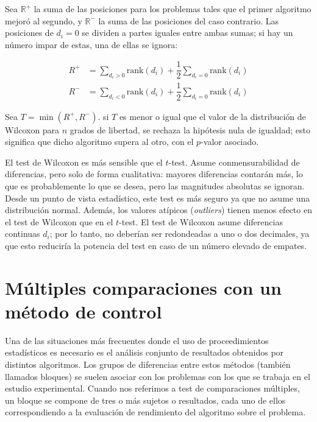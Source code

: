 Sea $\mathbb{R}^+$ la suma de las posiciones para los problemas tales que el primer algoritmo mejoró al segundo, y $\mathbb{R}^-$ la suma de las posiciones del caso contrario. 
Las posiciones de $d_i = 0$ se dividen a partes iguales entre ambas sumas; si hay un número impar de estas, una de ellas se ignora:

\begin{equation}
\begin{aligned}
R^+ & = \sum_{d_i>0} \text{rank}(d_i) + \dfrac{1}{2} \sum_{d_i=0}\text{rank}(d_i) \\
R^- & = \sum_{d_i<0} \text{rank}(d_i) + \dfrac{1}{2} \sum_{d_i=0}\text{rank}(d_i) 
\end{aligned}
\label{eq:4.34}
\end{equation}

Sea $T = \min(R^+,R^-)$. 
si $T$ es menor o igual que el valor de la distribución de Wilcoxon para $n$ grados de libertad, se rechaza la hipótesis nula de igualdad; esto significa que dicho algoritmo supera al otro, con el $p$-valor asociado. 

El test de Wilcoxon es más sensible que el $t$-test. 
Asume conmensurabilidad de diferencias, pero solo de forma cualitativa: mayores diferencias contarán más, lo que es probablemente lo que se desea, pero las magnitudes absolutas se ignoran. 
Desde un punto de vista estadístico, este test es más seguro ya que no asume una distribución normal. 
Además, los valores atípicos (\textit{outliers}) tienen menos efecto en el test de Wilcoxon que en el $t$-test. 
El test de Wilcoxon asume diferencias continuas $d_i$; por lo tanto, no deberían ser redondeadas a uno o dos decimales, ya que esto reduciría la potencia del test en caso de un número elevado de empates. 

\section{Múltiples comparaciones con un método de control}

Una de las situaciones más frecuentes donde el uso de proceedimientos estadísticos es necesario es el análisis conjunto de resultados obtenidos por distintos algoritmos. 
Los grupos de diferencias entre estos métodos (también llamados bloques) se suelen asociar con los problemas con los que se trabaja en el estudio experimental. 
Cuando nos referimos a test de comparaciones múltiples, un bloque se compone de tres o más sujetos o resultados, cada uno de ellos correspondiendo a la evaluación de rendimiento del algoritmo sobre el problema. 

